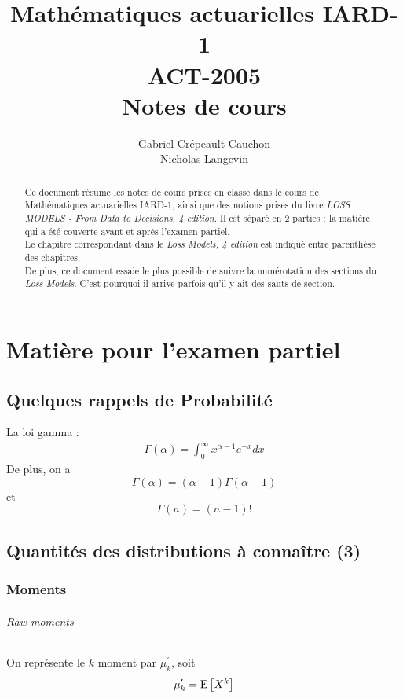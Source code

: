 \documentclass[12pt, french]{report}
\title{Mathématiques actuarielles IARD-1 \\
ACT-2005 \\
Notes de cours}
\author{Gabriel Crépeault-Cauchon \\
Nicholas Langevin}
\begin{document}
\maketitle

\tableofcontents


\begin{abstract}
Ce document résume les notes de cours prises en classe dans le cours de Mathématiques actuarielles IARD-1, ainsi que des notions prises du livre \textit{LOSS MODELS - From Data to Decisions, 4 edition}. Il est séparé en 2 parties : la matière qui a été couverte avant et après l'examen partiel. \\

Le chapitre correspondant dans le \emph{Loss Models, 4 edition} est indiqué entre parenthèse des chapitres. \\

De plus, ce document essaie le plus possible de suivre la numérotation des sections du \emph{Loss Models}. C'est pourquoi il arrive parfois qu'il y ait des sauts de section.
\end{abstract}


\part{Matière pour l'examen partiel}

\chapter{Quelques rappels de Probabilité}
La loi gamma : 
\begin{align*}
\Gamma(\alpha) = \int_{0}^{\infty} x^{\alpha-1} e^{-x} dx
\end{align*}
De plus, on a
\[\Gamma(\alpha) = (\alpha-1) \Gamma(\alpha-1)\]
et
\[\Gamma(n) = (n-1)!\]




\chapter{Quantités des distributions à connaître (3)}
\section{Moments}

\paragraph{\textit{Raw moments}}
On représente le $k$ moment par $\mu_k^\prime$, soit
\begin{equation}
\mu_k^\prime = \mathrm{E} \left[ X^k \right] 
\end{equation}
\end{document}
